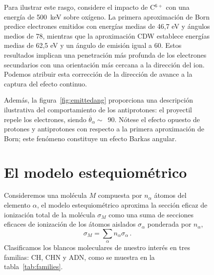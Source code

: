 \begin{figure}
Para ilustrar este rasgo, considere el impacto de C$^{6+}$ con una 
energía de 500~keV sobre oxígeno. La primera aproximación de Born 
predice electrones emitidos con energías medias de 46,7 eV y ángulos 
medios de 78\textdegree, mientras que la aproximación CDW establece 
energías medias de 62,5 eV y un ángulo de emisión igual a 60\textdegree. 
Estos resultados implican una penetración más profunda de los electrones 
secundarios con una orientación más cercana a la dirección del ion. 
Podemos atribuir esta corrección de la dirección de avance a la captura 
del efecto continuo.

Además, la figura~\ref{fig:emittedang} proporciona una descripción 
ilustrativa del comportamiento de los antiprotones: el proyectil repele 
los electrones, siendo $\overline{\theta}_{\alpha}\sim$~90\textdegree. 
Nótese el efecto opuesto de protones y antiprotones con respecto a la 
primera aproximación de Born; este fenómeno constituye un efecto Barkas 
angular.

\section{El modelo estequiométrico}
\label{sec:SSM}

Consideremos una molécula $M$ compuesta por $n_{\alpha}$ átomos del 
elemento $\alpha$, el modelo estequiométrico aproxima la sección eficaz 
de ionización total de la molécula $\sigma_{M}$ como una suma de 
secciones eficaces de ionización de los átomos aislados $\sigma_{\alpha}$ 
ponderada por $n_{\alpha}$, 
\begin{equation}
 \sigma_{M}=\sum\limits_{\alpha}n_{\alpha}\sigma_{\alpha}\,.  
 \label{eq:sumion}
\end{equation}
Clasificamos los blancos moleculares de nuestro interés en tres 
familias: CH, CHN y ADN, como se muestra en la tabla~\ref{tab:families}.


\end{figure}
